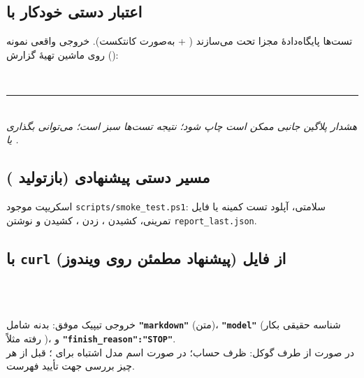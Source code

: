\documentclass[12pt,a4paper]{article}
\begin{document}
\subsection{اعتبار دستی خودکار با }
تست‌ها پایگاه‌دادهٔ مجزا تحت  می‌سازند ( +  به‌صورت کانتکست). خروجی واقعی نمونه () روی ماشین تهیهٔ گزارش:

\begin{tcolorbox}[colframe=softgold,colback=white,breakable,title=\lr{pytest}]
\\
\noindent\rule{\linewidth}{0.2pt}\\[1mm]
{\small\textit{هشدار پلاگین جانبی  ممکن است چاپ شود؛ نتیجه تست‌ها سبز است؛ می‌توانی  بگذاری یا .}}
\end{tcolorbox}

\subsection{مسیر دستی پیشنهادی (بازتولید )}
اسکریپت موجود \texttt{scripts/smoke\_test.ps1}: سلامتی، آپلود تست کمینه یا فایل تمرینی، کشیدن ، زدن ، کشیدن  و نوشتن \texttt{report\_last.json}.

\subsection{ با \texttt{curl} از فایل (پیشنهاد مطمئن روی ویندوز)}
\begin{tcolorbox}[colframe=mainblue,colback=white,breakable,title=\lr{curl.exe (بدنهٔ تکی فایل JSON)}]
\noindent{}\\
\noindent{}\\
\noindent{}
\end{tcolorbox}
خروجی تیپیک موفق: بدنه شامل \textbf{\texttt{"markdown"}} (متن)، \textbf{\texttt{"model"}} (شناسه حقیقی بکار رفته مثلاً )، و \textbf{\texttt{"finish\_reason":"STOP"}}.\\
در صورت \textbf{} از طرف گوکل: ظرف حساب؛ در صورت \textbf{} اسم مدل اشتباه برای ؛ قبل از هر چیز بررسی  جهت تأیید فهرست.
\end{document}
